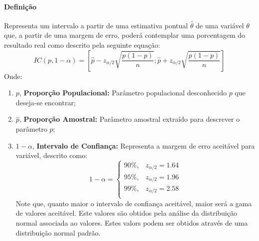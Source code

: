 \documentclass{article}
\begin{document}
            \paragraph{Definição}Representa um intervalo a partir de uma estimativa pontual $\hat{\theta}$ de uma variável $\theta$ que, a partir de uma margem de erro, poderá contemplar uma porcentagem do resultado real como descrito pela seguinte equação:
                \begin{equation}
                    \boxed{
                        IC (p, 1-\alpha) = 
                        \left[
                            \hat{p} - z_{\alpha/2}\sqrt{\frac{p(1-p)}{n}};
                            \hat{p} + z_{\alpha/2}\sqrt{\frac{p(1-p)}{n}}
                        \right]
                    }
                \end{equation}
            Onde:
                \begin{enumerate}[rightmargin = \leftmargin, noitemsep]
                    \item $p$, \textbf{Proporção Populacional:} Parâmetro populacional desconhecido $p$ que deseja-se encontrar;

                    \item $\hat{p}$, \textbf{Proporção Amostral:} Parâmetro amostral extraído para descrever o parâmetro $p$;

                    \item $1-\alpha$, \textbf{Intervalo de Confiança:} Representa a margem de erro aceitável para variável, descrito como:
                        \begin{equation}
                            \boxed{
                                1-\alpha =
                                \begin{cases}
                                    90\%, & z_{\alpha/2} = 1.64\\
                                    95\%, & z_{\alpha/2} = 1.96\\
                                    99\%, & z_{\alpha/2} = 2.58\\
                                \end{cases}
                            }\label{eq.intervalo}
                        \end{equation}
                    Note que, quanto maior o intervalo de confiança aceitável, maior será a gama de valores aceitável. Este valores são obtidos pela análise da distribuição normal associada ao valores. Estes valors podem ser obtidos através de uma distribuição normal padrão.
                \end{enumerate}
\end{document}
